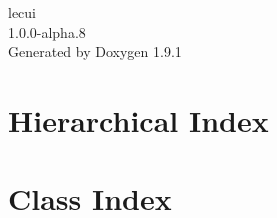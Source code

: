\let\mypdfximage\pdfximage\def\pdfximage{\immediate\mypdfximage}\documentclass[twoside]{book}
\newcommand{\+}{\discretionary{\mbox{\scriptsize$\hookleftarrow$}}{}{}}
\newcommand{\clearemptydoublepage}{%
  \newpage{\pagestyle{empty}\cleardoublepage}%
}
\begin{document}
\raggedbottom

\hypersetup{pageanchor=false,
             bookmarksnumbered=true,
             pdfencoding=unicode
            }
\begin{titlepage}
\vspace*{7cm}
\begin{center}%
{\Large lecui \\[1ex]\large 1.\+0.\+0-\/alpha.\+8 }\\
\vspace*{1cm}
{\large Generated by Doxygen 1.9.1}\\
\end{center}
\end{titlepage}
\clearemptydoublepage
{}
\tableofcontents
\clearemptydoublepage
{}
\hypersetup{pageanchor=true}

\chapter{Hierarchical Index}

\chapter{Class Index}

\end{document}
